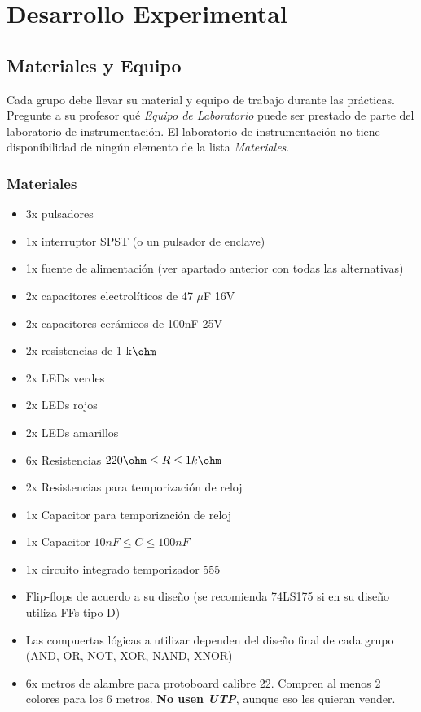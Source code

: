 
\section{Desarrollo Experimental}
\subsection{Materiales y Equipo}

Cada grupo debe llevar su material y equipo de trabajo durante las prácticas. Pregunte a su profesor qué \emph{Equipo de Laboratorio} puede ser prestado
de parte del laboratorio de instrumentación. El laboratorio de instrumentación no tiene disponibilidad de ningún elemento de la lista \emph{Materiales}.

\subsubsection*{Materiales}
\begin{itemize}
    \item 3x pulsadores
    \item 1x interruptor SPST (o un pulsador de enclave)
    \item 1x fuente de alimentación (ver apartado anterior con todas las alternativas)
    \item 2x capacitores electrolíticos de 47 $\mu$F 16V
    \item 2x capacitores cerámicos de 100nF 25V
    \item 2x resistencias de 1 k$\ohm$
    \item 2x LEDs verdes
    \item 2x LEDs rojos
    \item 2x LEDs amarillos
    \item 6x Resistencias $220 \ohm \leq R \leq 1 k\ohm$
    \item 2x Resistencias para temporización de reloj
    \item 1x Capacitor para temporización de reloj
    \item 1x Capacitor $10nF \leq C \leq 100nF$
    \item 1x circuito integrado temporizador 555
    \item Flip-flops de acuerdo a su diseño (se recomienda 74LS175 si en su diseño utiliza FFs tipo D)
    \item Las compuertas lógicas a utilizar dependen del diseño final de cada grupo (AND, OR, NOT, XOR, NAND, XNOR)
    \item 6x metros de alambre para protoboard calibre 22. Compren al menos 2 colores para los 6 metros. \textbf{No usen \emph{UTP}}, aunque eso les quieran vender.
\end{itemize}


